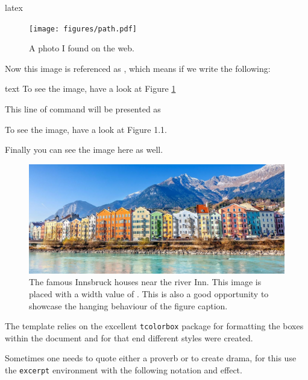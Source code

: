 \documentclass[minted, draw]{../tex/hebdomon}
\begin{document}
%
\begin{code}{latex}
\begin{figure}[ht]
  \centering
  \texttt{[image: figures/path.pdf]}
  \caption{A photo I found on the web.}\label{fig:innsbruck}
\end{figure}
\end{code}
%
\begin{hgitemize}
	\item[] Now this image is referenced as , which
	means if we write the following:
\end{hgitemize}
%
\begin{code}{text}
To see the image, have a look at Figure \ref{fig:innsbruck}
\end{code}
%
This line of command will be presented as
%
\begin{excerpt}
	To see the image, have a look at Figure 1.1.
\end{excerpt}
%
Finally you can see the image here as well.
%
\begin{figure}[ht]
	\centering
	\includegraphics[width=\linewidth]{figures/innsbruck.jpg}
	\caption{The famous Innsbruck houses near the river Inn. This image is
		placed with a width value of . This is also
		a good opportunity to showcase the hanging behaviour of the figure
		caption.}
\end{figure}
%
%
\begin{hgitemize}
	\item[\pcode{excerpt}] The template relies on the excellent \lstinline[columns=fixed]{tcolorbox}
	package for formatting the boxes within the document and for that end different styles were created.
	\item[] Sometimes one needs to quote either a proverb or to create drama, for this use
	the \lstinline[columns=fixed]{excerpt} environment with the following notation and effect.
\end{hgitemize}
%
\end{document}
